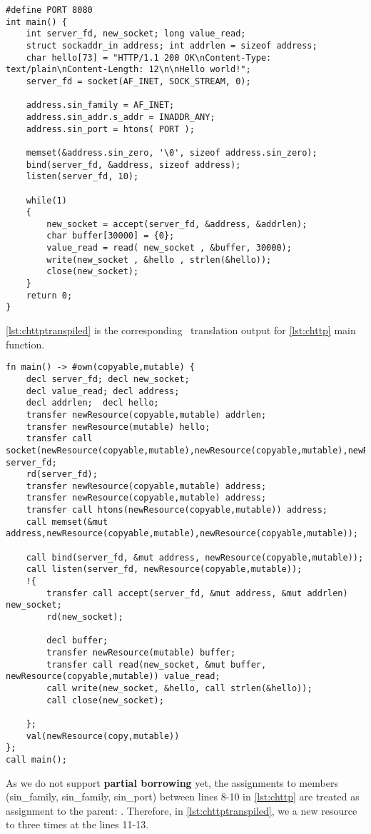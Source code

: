 \begin{lstlisting}[style=clang,caption={C Tiny-HTTP Server},label=lst:chttp]
#define PORT 8080
int main() {
    int server_fd, new_socket; long value_read;
    struct sockaddr_in address; int addrlen = sizeof address;
    char hello[73] = "HTTP/1.1 200 OK\nContent-Type: text/plain\nContent-Length: 12\n\nHello world!";
    server_fd = socket(AF_INET, SOCK_STREAM, 0);

    address.sin_family = AF_INET;
    address.sin_addr.s_addr = INADDR_ANY;
    address.sin_port = htons( PORT );

    memset(&address.sin_zero, '\0', sizeof address.sin_zero);    
    bind(server_fd, &address, sizeof address);
    listen(server_fd, 10);

    while(1)
    {
        new_socket = accept(server_fd, &address, &addrlen);
        char buffer[30000] = {0};
        value_read = read( new_socket , &buffer, 30000);
        write(new_socket , &hello , strlen(&hello));
        close(new_socket);
    }
    return 0;
}
\end{lstlisting}

\autoref{lst:chttptranspiled} is the corresponding \oslt~translation output for \autoref{lst:chttp} main function.\\

\begin{lstlisting}[style=osl,caption={OSL Corresponding transpilation},label=lst:chttptranspiled]
fn main() -> #own(copyable,mutable) {
    decl server_fd; decl new_socket;
    decl value_read; decl address;
    decl addrlen;  decl hello;
    transfer newResource(copyable,mutable) addrlen;
    transfer newResource(mutable) hello;
    transfer call socket(newResource(copyable,mutable),newResource(copyable,mutable),newResource(copyable,mutable)) server_fd;
    rd(server_fd);
    transfer newResource(copyable,mutable) address;
    transfer newResource(copyable,mutable) address;
    transfer call htons(newResource(copyable,mutable)) address;
    call memset(&mut address,newResource(copyable,mutable),newResource(copyable,mutable));

    call bind(server_fd, &mut address, newResource(copyable,mutable));
    call listen(server_fd, newResource(copyable,mutable));
    !{
        transfer call accept(server_fd, &mut address, &mut addrlen) new_socket;
        rd(new_socket);

        decl buffer;
        transfer newResource(mutable) buffer;
        transfer call read(new_socket, &mut buffer, newResource(copyable,mutable)) value_read;
        call write(new_socket, &hello, call strlen(&hello));
        call close(new_socket);
        
    };
    val(newResource(copy,mutable))
};
call main();
\end{lstlisting}

As we do not support \textbf{partial borrowing} yet, the assignments to  members (sin\_family, sin\_family, sin\_port) between lines 8-10  in \autoref{lst:chttp} are treated as assignment to the parent: . Therefore, in \autoref{lst:chttptranspiled}, we  a new resource to  three times at the lines 11-13.